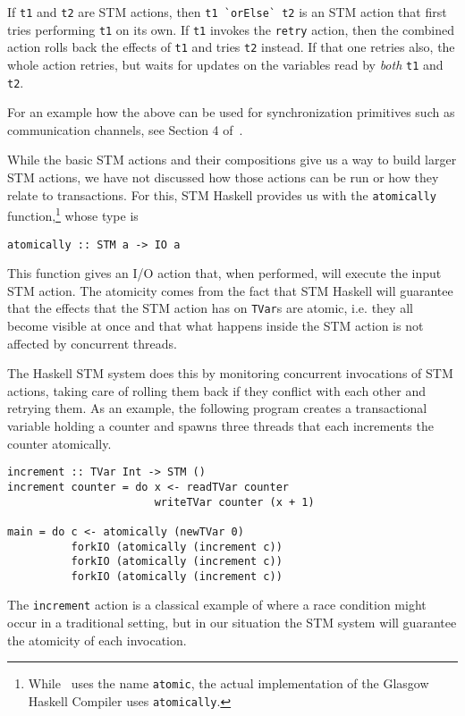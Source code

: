 If \lstinline+t1+ and \lstinline+t2+ are STM actions, then \lstinline+t1 `orElse` t2+
is an STM action that first tries performing \lstinline+t1+ on its own. 
If \lstinline+t1+ invokes the \lstinline+retry+ action,
then the combined action rolls back the effects of \lstinline+t1+ 
and tries \lstinline+t2+ instead. If that one retries also, the whole
action retries, but waits for updates on the variables read by {\em both} \lstinline+t1+ and \lstinline+t2+.

For an example how the above can be used for synchronization primitives such as communication channels, see Section
4 of~\cite{haskellstm}.

While the basic STM actions and their compositions give us a way to build larger STM actions, we have not
discussed how those actions can be run or how they relate to transactions. For this, STM Haskell provides us
with the \lstinline+atomically+ function,\footnote{While~\cite{haskellstm} uses the name \lstinline+atomic+, the actual implementation
of the Glasgow Haskell Compiler uses \lstinline+atomically+.} whose type is
\begin{lstlisting}[style=small]
atomically :: STM a -> IO a
\end{lstlisting}
This function gives an I/O action that, when performed, will execute the input STM action.
The atomicity comes from the fact that STM Haskell will guarantee that the effects that the STM action has on
\lstinline+TVar+s are atomic, i.e. they all become visible at once and that what happens
inside the STM action is not affected by concurrent threads.  

The Haskell STM system does this by monitoring concurrent invocations of STM actions, taking care of rolling
them back if they conflict with each other and retrying them.
As an example, the following program creates
a transactional variable holding a counter and spawns three threads that each increments the counter atomically.
\begin{lstlisting}[style=small]
increment :: TVar Int -> STM ()
increment counter = do x <- readTVar counter
                       writeTVar counter (x + 1)

main = do c <- atomically (newTVar 0)
          forkIO (atomically (increment c))
          forkIO (atomically (increment c))
          forkIO (atomically (increment c))
\end{lstlisting}
The \lstinline+increment+ action is a classical example of where a race condition might occur 
in a traditional setting,
but in our situation the STM system will guarantee the atomicity of each invocation.


